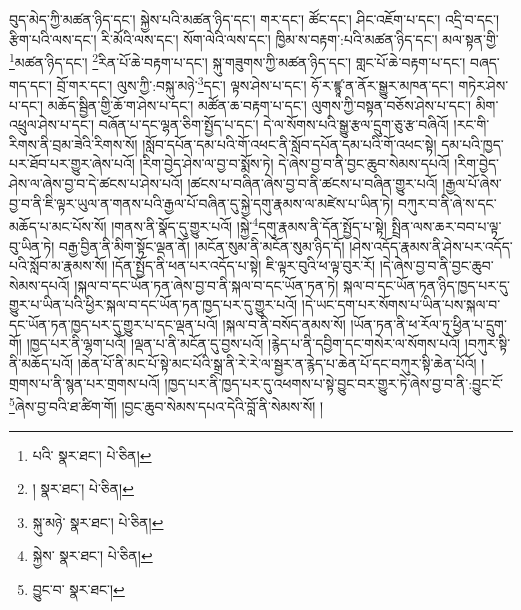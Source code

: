 བུད་མེད་ཀྱི་མཚན་ཉིད་དང་། སྐྱེས་པའི་མཚན་ཉིད་དང་། གར་དང་། ཚོང་དང་། ཤིང་འཇོག་པ་དང་། འདྲི་བ་དང་། རྩིག་པའི་ལས་དང་། རི་མོའི་ལས་དང་། སོག་ལེའི་ལས་དང་། ཁྱིམ་ས་བརྟག་:པའི་མཚན་ཉིད་དང་། མལ་སྟན་གྱི་\footnote{པའི་  སྣར་ཐང་།  པེ་ཅིན། }མཚན་ཉིད་དང་། \footnote{།    སྣར་ཐང་།  པེ་ཅིན། }རིན་པོ་ཆེ་བརྟག་པ་དང་། སྐུ་གཟུགས་ཀྱི་མཚན་ཉིད་དང་། གླང་པོ་ཆེ་བརྟག་པ་དང་། བཞད་གད་དང་། བྲོ་གར་དང་། ལུས་ཀྱི་:བསྐུ་མཉེ་\footnote{སྐུ་མཉེ་  སྣར་ཐང་།  པེ་ཅིན། }དང་། ལྟས་ཤེས་པ་དང་། ཧོ་ར་ཛྙཱ་ན་ནོར་སྒྱུར་མཁན་དང་། གཏེར་ཤེས་པ་དང་། མཆོད་སྦྱིན་གྱི་ཆོ་ག་ཤེས་པ་དང་། མཚོན་ཆ་བརྟག་པ་དང་། ལུགས་ཀྱི་བསྟན་བཅོས་ཤེས་པ་དང་། མིག་འཕྲུལ་ཤེས་པ་དང་། བཞོན་པ་དང་ལྷན་ཅིག་སྤྱོད་པ་དང་། དེ་ལ་སོགས་པའི་སྒྱུ་རྩལ་དྲུག་ཅུ་རྩ་བཞིའོ། །རང་གི་རིགས་ནི་བྲམ་ཟེའི་རིགས་སོ། །སློབ་དཔོན་དམ་པའི་གོ་འཕང་ནི་སློབ་དཔོན་དམ་པའི་གོ་འཕང་སྟེ། དམ་པའི་ཁྱད་པར་ཐོབ་པར་གྱུར་ཞེས་པའོ། །རིག་བྱེད་ཤེས་ལ་བྱ་བ་སྨོས་ཏེ། དེ་ཞེས་བྱ་བ་ནི་བྱང་ཆུབ་སེམས་དཔའོ། །རིག་བྱེད་ཤེས་ལ་ཞེས་བྱ་བ་དེ་ཚངས་པ་ཤེས་པའོ། །ཚངས་པ་བཞིན་ཞེས་བྱ་བ་ནི་ཚངས་པ་བཞིན་གྱུར་པའོ། །རྒྱལ་པོ་ཞེས་བྱ་བ་ནི་ཇི་ལྟར་ཡུལ་ན་གནས་པའི་རྒྱལ་པོ་བཞིན་དུ་སྐྱེ་དགུ་རྣམས་ལ་མཛེས་པ་ཡིན་ཏེ། བཀུར་བ་ནི་ཞེ་ས་དང་མཆོད་པ་མང་པོས་སོ། །གནས་ནི་སྣོད་དུ་གྱུར་པའོ། །སྐྱེ་\footnote{སྐྱེས་  སྣར་ཐང་།  པེ་ཅིན། }དགུ་རྣམས་ནི་དོན་སྤྱོད་པ་སྟེ། སྤྲིན་ལས་ཆར་བབ་པ་ལྟ་བུ་ཡིན་ཏེ། བརྒྱ་བྱིན་ནི་མིག་སྟོང་ལྡན་ནོ། །མངོན་སུམ་ནི་མངོན་སུམ་ཉིད་དོ། །ཤེས་འདོད་རྣམས་ནི་ཤེས་པར་འདོད་པའི་སློབ་མ་རྣམས་སོ། །དོན་སྤྱོད་ནི་ཕན་པར་འདོད་པ་སྟེ། ཇི་ལྟར་བུའི་ཕ་ལྟ་བུར་རོ། །དེ་ཞེས་བྱ་བ་ནི་བྱང་ཆུབ་སེམས་དཔའོ། །སྐལ་བ་དང་ཡོན་ཏན་ཞེས་བྱ་བ་ནི་སྐལ་བ་དང་ཡོན་ཏན་ཏེ། སྐལ་བ་དང་ཡོན་ཏན་ཉིད་ཁྱད་པར་དུ་གྱུར་པ་ཡིན་པའི་ཕྱིར་སྐལ་བ་དང་ཡོན་ཏན་ཁྱད་པར་དུ་གྱུར་པའོ། །དེ་ཡང་དག་པར་སོགས་པ་ཡིན་པས་སྐལ་བ་དང་ཡོན་ཏན་ཁྱད་པར་དུ་གྱུར་པ་དང་ལྡན་པའོ། །སྐལ་བ་ནི་བསོད་ནམས་སོ། །ཡོན་ཏན་ནི་ཕ་རོལ་ཏུ་ཕྱིན་པ་དྲུག་གོ། །ཁྱད་པར་ནི་ལྷག་པའོ། །ལྡན་པ་ནི་མངོན་དུ་བྱས་པའོ། །རྙེད་པ་ནི་དབྱིག་དང་གསེར་ལ་སོགས་པའོ། །བཀུར་སྟི་ནི་མཆོད་པའོ། །ཆེན་པོ་ནི་མང་པོ་སྟེ་མང་པོའི་སྒྲ་ནི་རེ་རེ་ལ་སྦྱར་ན་རྙེད་པ་ཆེན་པོ་དང་བཀུར་སྟི་ཆེན་པོའོ། །གྲགས་པ་ནི་སྙན་པར་གྲགས་པའོ། །ཁྱད་པར་ནི་ཁྱད་པར་དུ་འཕགས་པ་སྟེ་བྱུང་བར་གྱུར་ཏེ་ཞེས་བྱ་བ་ནི་:བྱུང་ངོ་\footnote{བྱུང་བ་  སྣར་ཐང་། }ཞེས་བྱ་བའི་ཐ་ཚིག་གོ། །བྱང་ཆུབ་སེམས་དཔའ་དེའི་བློ་ནི་སེམས་སོ། །
